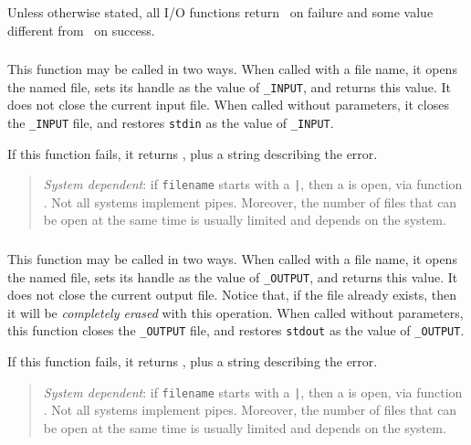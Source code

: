 Unless otherwise stated,
all I/O functions return \nil\ on failure and
some value different from \nil\ on success.

\subsubsection*{\ff {}}

This function may be called in two ways.
When called with a file name, it opens the named file,
sets its handle as the value of \verb|_INPUT|,
and returns this value.
It does not close the current input file.
When called without parameters,
it closes the \verb|_INPUT| file,
and restores \verb|stdin| as the value of \verb|_INPUT|.

If this function fails, it returns \nil,
plus a string describing the error.

\begin{quotation}
\noindent
\emph{System dependent}: if \verb|filename| starts with a \verb-|-,
then a  is open, via function .
Not all systems implement pipes.
Moreover,
the number of files that can be open at the same time is
usually limited and depends on the system.
\end{quotation}

\subsubsection*{\ff {}}

This function may be called in two ways.
When called with a file name,
it opens the named file,
sets its handle as the value of \verb|_OUTPUT|,
and returns this value.
It does not close the current output file.
Notice that, if the file already exists,
then it will be \emph{completely erased} with this operation.
When called without parameters,
this function closes the \verb|_OUTPUT| file,
and restores \verb|stdout| as the value of \verb|_OUTPUT|.

If this function fails, it returns \nil,
plus a string describing the error.

\begin{quotation}
\noindent
\emph{System dependent}: if \verb|filename| starts with a \verb-|-,
then a  is open, via function .
Not all systems implement pipes.
Moreover,
the number of files that can be open at the same time is
usually limited and depends on the system.
\end{quotation}

